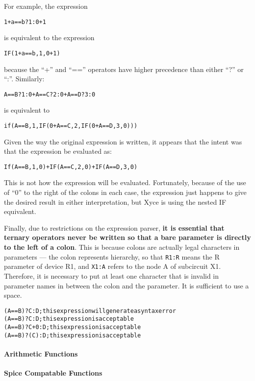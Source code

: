 For example, the expression
\begin{alltt}
  1+a==b?1:0+1
\end{alltt}
is equivalent to the expression
\begin{alltt}
  IF(1+a==b,1,0+1)
\end{alltt}
because the ``+'' and ``=='' operators have higher precedence than
either ``?'' or ``:''.  Similarly:
\begin{alltt}
  A==B?1:0 + A==C?2:0 + A==D?3:0
\end{alltt}
is equivalent to
\begin{alltt}
  if(A==B,1,IF(0 + A==C,2,IF(0 + A==D,3,0)))
\end{alltt}
Given the way the original expression is written, it appears that the
intent was that the expression be evaluated as:
\begin{alltt}
  If(A==B,1,0) + IF(A==C,2,0) + IF(A==D,3,0)
\end{alltt}
This is not how the expression will be evaluated.  Fortunately,
because of the use of ``0'' to the right of the colons in each case,
the expression just happens to give the desired result in either
interpretation, but Xyce is using the nested IF equivalent.

Finally, due to restrictions on the expression parser, {\bf it is essential
that ternary operators never be written so that a bare parameter is
directly to the left of a colon}.  This is because colons are actually
legal characters in parameters --- the colon represents hierarchy, so
that \texttt{R1:R} means the R parameter of device R1, and
\texttt{X1:A} refers to the node A of subcircuit X1.  Therefore, it is
necessary to put at least one character that is invalid in parameter names
in between the colon and the parameter.  It is sufficient to use a space.
\begin{alltt}
    {\color{red} (A==B)?C:D}  ; this expression will generate a syntax error
    {(A==B)?C :D}  ; this expression is acceptable
    {(A==B)?C+0:D}  ; this expression is acceptable
    {(A==B)?(C):D}  ; this expression is acceptable
\end{alltt}

\paragraph{Arithmetic Functions}


\paragraph{Spice Compatable Functions}


